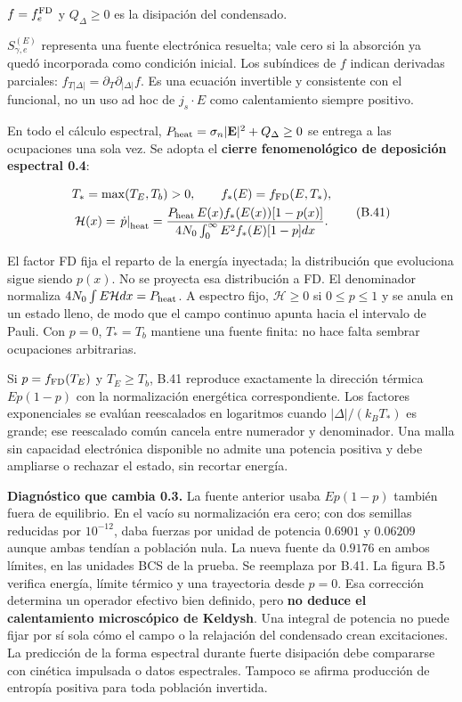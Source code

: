 \documentclass[
  spanish,
  10pt,
  a4paper,
]{article}
\begin{document}
\(f=f_e^{\rm FD}\) y \(Q_\Delta\geq0\) es la disipación del condensado.

\(S_{\gamma,e}^{(E)}\) representa una fuente electrónica resuelta; vale
cero si la absorción ya quedó incorporada como condición inicial. Los
subíndices de \(f\) indican derivadas parciales:
\(f_{T|\Delta|}=\partial_T\partial_{|\Delta|}f\). Es una ecuación
invertible y consistente con el funcional, no un uso ad hoc de
\(j_s\cdot E\) como calentamiento siempre positivo.

En todo el cálculo espectral,
\(P_{\rm heat}=\sigma_n|\mathbf E|^2+Q_\Delta\geq0\) se entrega a las
ocupaciones una sola vez. Se adopta el \textbf{cierre fenomenológico de
deposición espectral 0.4}:

\[
\begin{gathered}
T_*=\max(T_E,T_b)>0,\qquad f_*(E)=f_{\rm FD}(E,T_*),\\
\mathcal H(x)=\left.\dot p\right|_{\rm heat}
=\frac{P_{\rm heat}\,E(x)f_*(E(x))[1-p(x)]}
{4N_0\int_0^\infty E^2 f_*(E)[1-p]dx}.
\end{gathered}
\tag{B.41}
\]

El factor FD fija el reparto de la energía inyectada; la distribución
que evoluciona sigue siendo \(p(x)\). No se proyecta esa distribución a
FD. El denominador normaliza \(4N_0\int E\mathcal Hdx=P_{\rm heat}\). A
espectro fijo, \(\mathcal H\geq0\) si \(0\leq p\leq1\) y se anula en un
estado lleno, de modo que el campo continuo apunta hacia el intervalo de
Pauli. Con \(p=0\), \(T_*=T_b\) mantiene una fuente finita: no hace
falta sembrar ocupaciones arbitrarias.

Si \(p=f_{\rm FD}(T_E)\) y \(T_E\geq T_b\), B.41 reproduce exactamente
la dirección térmica \(E p(1-p)\) con la normalización energética
correspondiente. Los factores exponenciales se evalúan reescalados en
logaritmos cuando \(|\Delta|/(k_BT_*)\) es grande; ese reescalado común
cancela entre numerador y denominador. Una malla sin capacidad
electrónica disponible no admite una potencia positiva y debe ampliarse
o rechazar el estado, sin recortar energía.

\textbf{Diagnóstico que cambia 0.3.} La fuente anterior usaba
\(E p(1-p)\) también fuera de equilibrio. En el vacío su normalización
era cero; con dos semillas reducidas por \(10^{-12}\), daba fuerzas por
unidad de potencia \(0.6901\) y \(0.06209\) aunque ambas tendían a
población nula. La nueva fuente da \(0.9176\) en ambos límites, en las
unidades BCS de la prueba. Se reemplaza por B.41. La figura B.5 verifica
energía, límite térmico y una trayectoria desde \(p=0\). Esa corrección
determina un operador efectivo bien definido, pero \textbf{no deduce el
calentamiento microscópico de Keldysh}. Una integral de potencia no
puede fijar por sí sola cómo el campo o la relajación del condensado
crean excitaciones. La predicción de la forma espectral durante fuerte
disipación debe compararse con cinética impulsada o datos espectrales.
Tampoco se afirma producción de entropía positiva para toda población
invertida.
\end{document}
